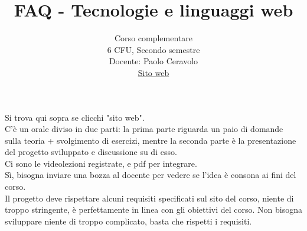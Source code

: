 \documentclass{article}
\title{FAQ - \textbf{Tecnologie e linguaggi web}}
\date{}
\author{Corso complementare\\6 CFU, Secondo semestre\\
Docente: Paolo Ceravolo\\ 
\href{https://pceravolopwm.ariel.ctu.unimi.it/v5/home/Default.aspx}{Sito web}}
\begin{document}
 
\maketitle

\begin{enumerate}

\rmfamily
{} 
Si trova qui sopra se clicchi "sito web".\\
	
C'è un orale diviso in due parti: la prima parte riguarda un paio di domande sulla teoria + svolgimento di esercizi, mentre la seconda parte
è la presentazione del progetto sviluppato e discussione su di esso.\\

Ci sono le videolezioni registrate, e pdf per integrare. \\

Sì, bisogna inviare una bozza al docente per vedere se l'idea è consona ai fini del corso.\\

Il progetto deve rispettare alcuni requisiti specificati sul sito del corso, niente di troppo stringente, è perfettamente in linea con gli obiettivi del corso. Non bisogna sviluppare niente di troppo complicato, basta che rispetti i requisiti.
 
\end{enumerate}
\end{document}
